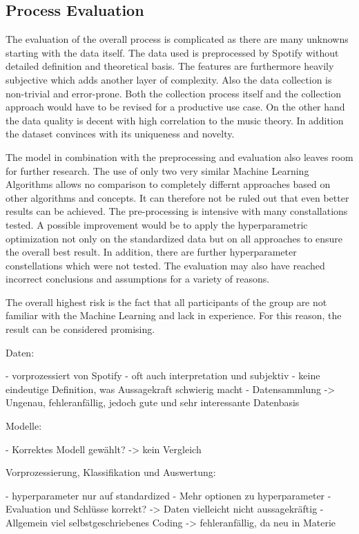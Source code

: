 \subsection{Process Evaluation}

The evaluation of the overall process is complicated as there are many unknowns starting with the data itself. The data used is preprocessed by 
Spotify without detailed definition and theoretical basis. The features are furthermore heavily subjective which adds another layer of 
complexity. Also the data collection is non-trivial and error-prone. Both the collection process itself and the collection approach 
would have to be revised for a productive use case. On the other hand the data quality is decent with high correlation to the music 
theory. In addition the dataset convinces with its uniqueness and novelty.

The model in combination with the preprocessing and evaluation also leaves room for further research. The use of only two very 
similar Machine Learning Algorithms allows no comparison to completely differnt approaches based on other algorithms and concepts. 
It can therefore not be ruled out that even better results can be achieved. The pre-processing is intensive with many constallations 
tested. A possible improvement would be to apply the hyperparametric optimization not only on the standardized data but on all 
approaches to ensure the overall best result. In addition, there are further hyperparameter constellations which were not tested.
The evaluation may also have reached incorrect conclusions and assumptions for a variety of reasons. 

The overall highest risk is the fact that all participants of the group are not familiar with the Machine Learning and lack in 
experience. For this reason, the result can be considered promising. 


Daten:

- vorprozessiert von Spotify
- oft auch interpretation und subjektiv
- keine eindeutige Definition, was Aussagekraft schwierig macht
- Datensammlung -> Ungenau, fehleranfällig, jedoch gute und sehr interessante Datenbasis

Modelle:

- Korrektes Modell gewählt? -> kein Vergleich 

Vorprozessierung, Klassifikation und Auswertung: 

- hyperparameter nur auf standardized 
- Mehr optionen zu hyperparameter
- Evaluation und Schlüsse korrekt? -> Daten vielleicht nicht aussagekräftig
- Allgemein viel selbstgeschriebenes Coding -> fehleranfällig, da neu in Materie